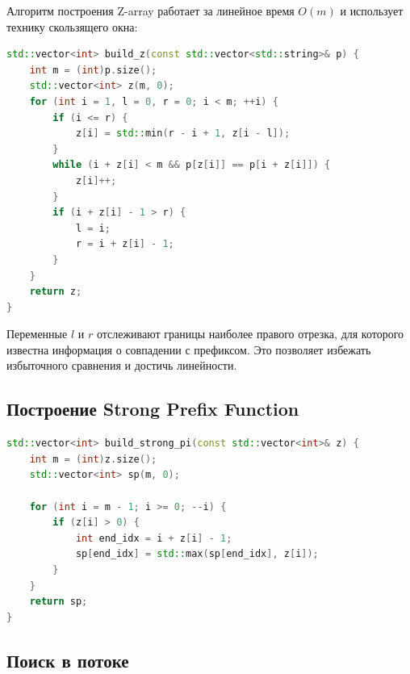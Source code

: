 Алгоритм построения Z-array работает за линейное время $O(m)$ и использует технику скользящего окна:

\begin{lstlisting}[language=C++]
std::vector<int> build_z(const std::vector<std::string>& p) {
    int m = (int)p.size();
    std::vector<int> z(m, 0);
    for (int i = 1, l = 0, r = 0; i < m; ++i) {
        if (i <= r) {
            z[i] = std::min(r - i + 1, z[i - l]);
        }
        while (i + z[i] < m && p[z[i]] == p[i + z[i]]) {
            z[i]++;
        }
        if (i + z[i] - 1 > r) {
            l = i;
            r = i + z[i] - 1;
        }
    }
    return z;
}
\end{lstlisting}

Переменные $l$ и $r$ отслеживают границы наиболее правого отрезка, для которого известна информация о совпадении с префиксом. Это позволяет избежать избыточного сравнения и достичь линейности.

\subsection{Построение Strong Prefix Function}

\begin{lstlisting}[language=C++]
std::vector<int> build_strong_pi(const std::vector<int>& z) {
    int m = (int)z.size();
    std::vector<int> sp(m, 0);
    
    for (int i = m - 1; i >= 0; --i) {
        if (z[i] > 0) {
            int end_idx = i + z[i] - 1;
            sp[end_idx] = std::max(sp[end_idx], z[i]);
        }
    }
    return sp;
}
\end{lstlisting}

\subsection{Поиск в потоке}

